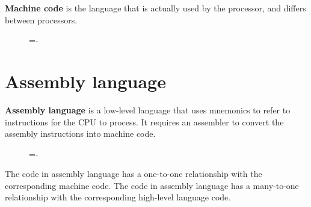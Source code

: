\documentclass[a4paper]{systems-software}
\begin{document}
\textbf{Machine code} is the language that is actually used by the processor, and differs between processors.

\begin{figure}[H]
  \lineskip=-\fboxrule
\end{figure}


\section*{Assembly language}

\textbf{Assembly language} is a low-level language that uses mnemonics to refer to instructions for the CPU to process. It requires an assembler to convert the assembly instructions into machine code.

\begin{figure}[H]
  \lineskip=-\fboxrule
\end{figure}

The code in assembly language has a one-to-one relationship with the corresponding machine code.
The code in assembly language has a many-to-one relationship with the corresponding high-level language code.
\end{document}

